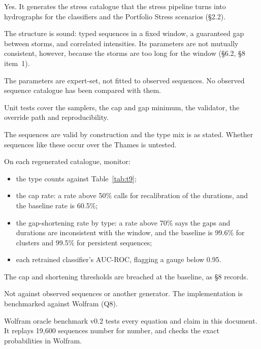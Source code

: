 \documentclass[11pt,a4paper]{article}
\begin{document}
Yes. It generates the stress catalogue that the stress pipeline turns into hydrographs for
the classifiers and the Portfolio Stress scenarios (\S2.2).

The structure is sound: typed sequences in a fixed window, a guaranteed gap between storms,
and correlated intensities. Its parameters are not mutually consistent, however, because
the storms are too long for the window (\S6.2, \S8 item~1).

The parameters are expert-set, not fitted to observed sequences. No observed sequence
catalogue has been compared with them.

Unit tests cover the samplers, the cap and gap minimum, the validator, the override path
and reproducibility.

The sequences are valid by construction and the type mix is as stated. Whether sequences
like these occur over the Thames is untested.

On each regenerated catalogue, monitor:
\begin{itemize}[nosep]
    \item the type counts against Table~\ref{tab:t9};
    \item the cap rate: a rate above 50\% calls for recalibration of the durations, and the
          baseline rate is 60.5\%;
    \item the gap-shortening rate by type: a rate above 70\% says the gaps and durations
          are inconsistent with the window, and the baseline is 99.6\% for clusters and
          99.5\% for persistent sequences;
    \item each retrained classifier's AUC-ROC, flagging a gauge below 0.95.
\end{itemize}
The cap and shortening thresholds are breached at the baseline, as \S8 records.

Not against observed sequences or another generator. The implementation is benchmarked
against Wolfram (Q8).

Wolfram oracle benchmark v0.2 tests every equation and claim in this document. It replays
19{,}600 sequences number for number, and checks the exact probabilities in Wolfram.
\end{document}

